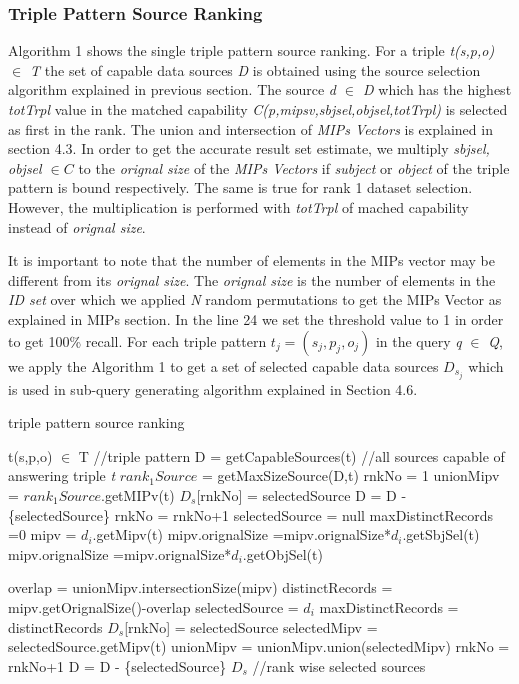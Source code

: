 \documentclass{sig-alternate}  %
\begin{document}
\subsubsection{Triple Pattern Source Ranking}
Algorithm 1 shows the single triple pattern source ranking. For a triple \emph{t(s,p,o) $\in$ T } the set of capable data sources \emph{D} is obtained using the source selection algorithm explained in previous section. The source \emph{d $\in$ D} which has the highest \emph{totTrpl} value in the matched capability \emph{C(p,mipsv,sbjsel,objsel,totTrpl)} is selected as first in the rank. The union and intersection of \emph{MIPs Vectors} is explained in section 4.3. In order to get the accurate result set estimate, we multiply \emph{sbjsel, objsel $\in C$} to the \emph{orignal size} of the \emph{MIPs Vectors} if \emph{subject} or \emph{object} of the triple pattern is bound respectively. The same is true for rank 1 dataset selection. However, the multiplication is performed with \emph{totTrpl} of mached capability instead of \emph{orignal size}. 

It is important to note that the number of elements in the MIPs vector may be different from its \emph{orignal size}. The \emph{orignal size} is the number of elements in the \emph{ID set} over which we applied \emph{N} random permutations to get the MIPs Vector as explained in MIPs section. In the line 24 we set the threshold value to 1 in order to get 100\% recall. For each triple pattern $t_j = (s_j, p_j, o_j)$ in the query \emph{q} $\in$ \emph{Q}, we apply the Algorithm 1 to get a set of selected capable data sources \emph{$D_{s_j}$} which is used in sub-query generating algorithm explained in Section 4.6.

\begin{algorithm}
\caption{triple pattern source ranking}
\begin{algorithmic} [1]
\REQUIRE  t(s,p,o) $\in$ T  //triple pattern 
\STATE D = getCapableSources(t) //all sources capable of answering triple \emph{t}
\STATE $rank_1Source$ = getMaxSizeSource(D,t)
\STATE rnkNo = 1
\STATE unionMipv = $rank_1Source$.getMIPv(t) 
\STATE $D_{s}$[rnkNo] = selectedSource
\STATE D = D - \{selectedSource\}
\STATE rnkNo = rnkNo+1
\STATE selectedSource = null
\STATE maxDistinctRecords =0
\STATE mipv = $d_i$.getMipv(t)
\STATE mipv.orignalSize =mipv.orignalSize*$d_i$.getSbjSel(t)
\STATE mipv.orignalSize =mipv.orignalSize*$d_i$.getObjSel(t)
\ENDIF

\STATE overlap = unionMipv.intersectionSize(mipv)
\STATE distinctRecords = mipv.getOrignalSize()-overlap
\STATE selectedSource = $d_i$
\STATE maxDistinctRecords = distinctRecords
\ENDIF
\ENDFOR
{}
\STATE $D_{s}$[rnkNo] = selectedSource
\STATE selectedMipv = selectedSource.getMipv(t)
\STATE  unionMipv =  unionMipv.union(selectedMipv)
\STATE rnkNo = rnkNo+1
\ENDIF
\STATE D = D - \{selectedSource\}
\ENDWHILE
\RETURN $D_{s}$  //rank wise selected sources
\end{algorithmic}
\end{algorithm}
\end{document}
